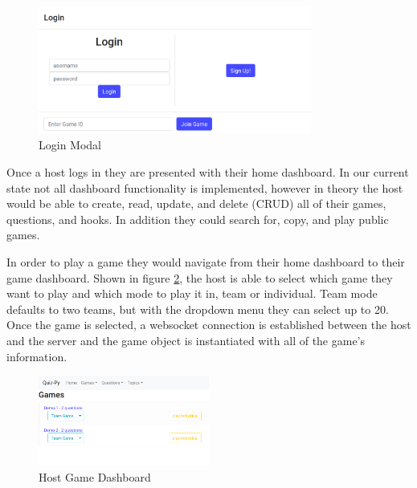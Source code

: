 \documentclass{article}
\begin{document}
            \begin{figure}[ht]
                \centering
                \includegraphics[width=0.8\textwidth]{images/frontend-login.png}
                \caption{Login Modal}
                \label{fig:frontend-login}
            \end{figure}
            
            Once a host logs in they are presented with their home dashboard. In our current state not all dashboard functionality is implemented, however in theory the host would be able to create, read, update, and delete (CRUD) all of their games, questions, and hooks. In addition they could search for, copy, and play public games.
            \smallskip
            
            In order to play a game they would navigate from their home dashboard to their game dashboard. Shown in figure \ref{fig:frontend-games_dashboard}, the host is able to select which game they want to play and which mode to play it in, team or individual. Team mode defaults to two teams, but with the dropdown menu they can select up to 20. Once the game is selected, a websocket connection is established between the host and the server and the game object is instantiated with all of the game's information.  
            
            \begin{figure}[H]
                \centering
                \includegraphics[width=0.5\textwidth]{images/frontend-games_dashboard.png}
                \caption{Host Game Dashboard}
                \label{fig:frontend-games_dashboard}
            \end{figure}
            
\end{document}

